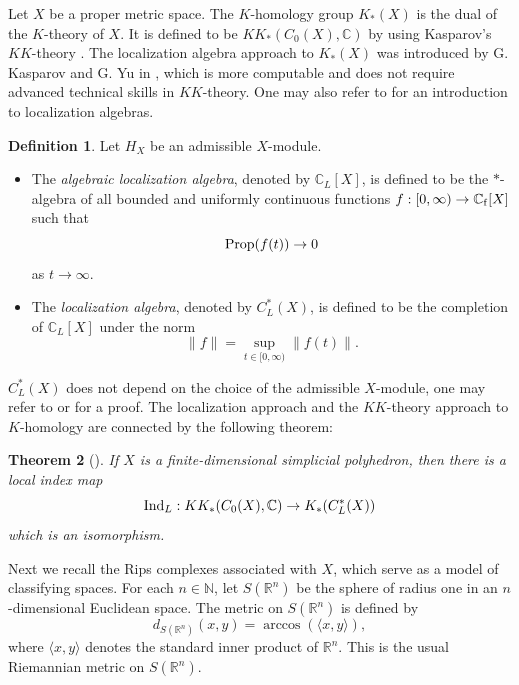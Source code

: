 \documentclass{article}
\theoremstyle{plain}
\newtheorem{theorem}{Theorem}[section]
\theoremstyle{definition}
\newtheorem{definition}[theorem]{Definition}
\theoremstyle{remark}
\begin{document}
	Let $X$ be a proper metric space. The $K$-homology group $K_*(X)$ is the dual of the $K$-theory of $X$. It is defined to be $KK_*(C_0(X),\mathbb C)$ by using Kasparov's $KK$-theory \cite{kasparov1988equivariant}. 
	The localization algebra approach to $K_*(X)$ was introduced by G. Kasparov and G. Yu in \cite{kasparov2012novikov}, which is more computable and does not require advanced technical skills in $KK$-theory. One may also refer to \cite{yu1997localization, willett2020higher, qiao2010localization} for an introduction to localization algebras.
	\begin{definition}\label{localization algebra}
		Let $H_X$ be an admissible $X$-module.
		\begin{itemize}
			\item[(1)] The {\em algebraic localization algebra}, denoted by $\mathbb{C}_L[X]$, is defined to be the $*$-algebra of all bounded and uniformly continuous functions $f:[0,\infty)\to\mathbb C_{\rm f}[X]$ such that
			$$\textup{Prop}(f(t))\to0$$
			as $t\to\infty$.
			\item[(2)] The {\em localization algebra}, denoted by $C^*_L(X)$, is defined to be the completion of $\mathbb{C}_L[X]$ under the norm
			$$\|f\|=\sup_{t\in[0,\infty)}\|f(t)\|.$$
	\end{itemize}\end{definition}
	
	$C^*_L(X)$ does not depend on the choice of the admissible $X$-module, one may refer to \cite{kasparov2012novikov} or \cite[Chapter 6]{yu2000coarse} for a proof. The localization approach and the $KK$-theory approach to $K$-homology are connected by the following theorem:
	
	\begin{theorem}[\cite{kasparov2012novikov}]
		If $X$ is a finite-dimensional simplicial polyhedron, then there is a local index map
		$$\textup{Ind}_L:KK_*(C_0(X),\mathbb C)\to K_*(C^*_L(X))$$
		which is an isomorphism.
	\end{theorem}
	
	Next we recall the Rips complexes associated with $X$, which serve as a model of classifying spaces. For each $n\in\mathbb N$, let $S(\mathbb{R}^n)$ be the sphere of radius one in an $n$-dimensional Euclidean space. The metric on $S(\mathbb{R}^n)$ is defined by
	$$d_{S(\mathbb R^n)}(x,y)=\arccos(\langle x,y\rangle),$$
	where $\langle x,y\rangle$ denotes the standard inner product of $\mathbb R^n$. This is the usual Riemannian metric on $S(\mathbb{R}^n)$.
	
\end{document}
